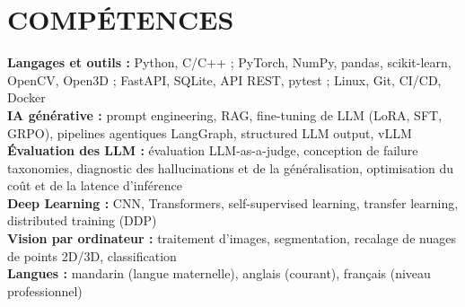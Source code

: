 \documentclass[a4paper,11pt]{article}
\let\oldsection\section
\renewcommand{\section}[1]{\needspace{5\baselineskip}\oldsection{#1}}
\begin{document}
\section{COMPÉTENCES}
 \begin{itemize}[leftmargin=0in, label={}]
    \small{\item{
    \textbf{Langages et outils :} Python, C/C++ ; PyTorch, NumPy, pandas, scikit-learn, OpenCV, Open3D ; FastAPI, SQLite, API REST, pytest ; Linux, Git, CI/CD, Docker\\
    \textbf{IA générative :} prompt engineering, RAG, fine-tuning de LLM (LoRA, SFT, GRPO), pipelines agentiques LangGraph, structured LLM output, vLLM\\
    \textbf{Évaluation des LLM :} évaluation LLM-as-a-judge, conception de failure taxonomies, diagnostic des hallucinations et de la généralisation, optimisation du coût et de la latence d'inférence\\
    \textbf{Deep Learning :} CNN, Transformers, self-supervised learning, transfer learning, distributed training (DDP)\\
    \textbf{Vision par ordinateur :} traitement d'images, segmentation, recalage de nuages de points 2D/3D, classification\\
    \textbf{Langues :} mandarin (langue maternelle), anglais (courant), français (niveau professionnel)
    }}
 \end{itemize}
\end{document}
